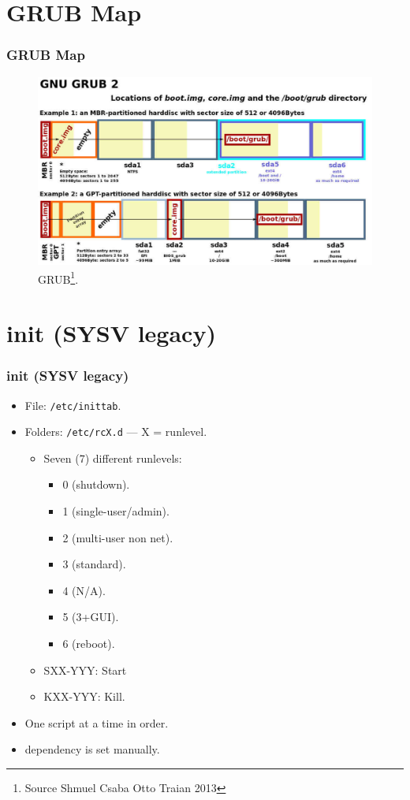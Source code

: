 \documentclass[aspectratio=169, xcolor=table, notheorems, hyperref={pdfpagelabels=false}]{beamer}
\begin{document}
\section{GRUB Map}
\begin{frame}
\frametitle{GRUB Map}
\begin{figure}
\includegraphics[width=0.69\linewidth]{os03-Shmuel-Csaba-Otto-Traian-2013-GRUB.jpg}
\caption{GRUB\footnote{Source Shmuel Csaba Otto Traian 2013}.}
\end{figure}
\end{frame}

\section{init (SYSV legacy)}
\begin{frame}
\frametitle{init (SYSV legacy)}
\begin{itemize}
\item File: \texttt{/etc/inittab}.
\item Folders: \texttt{/etc/rcX.d} --- X = runlevel.
\begin{itemize}
\item Seven (7) different runlevels: 
\begin{itemize}
\item 0 (shutdown).
\item 1 (single-user/admin).
\item 2 (multi-user non net).
\item 3 (standard).
\item 4 (N/A).
\item 5 (3+GUI).
\item 6 (reboot).
\end{itemize}
\item SXX-YYY: Start
\item KXX-YYY: Kill.
\end{itemize}
\item One script at a time in order.
\item dependency is set manually.
\end{itemize}
\end{frame}
\end{document}
